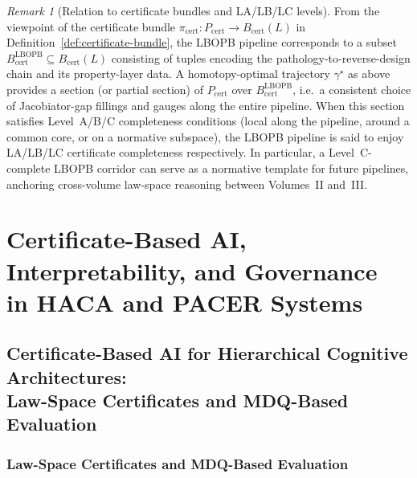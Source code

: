 \documentclass[11pt]{book}
\theoremstyle{plain}
\theoremstyle{definition}
\theoremstyle{remark}
\newtheorem{remark}[theorem]{Remark}
\begin{document}
\begin{remark}[Relation to certificate bundles and LA/LB/LC levels]
\label{rem:lbopb-cert-bundle-levels}
From the viewpoint of the certificate bundle
$\pi_{\mathrm{cert}}:P_{\mathrm{cert}}\to B_{\mathrm{cert}}(L)$ in
Definition~\ref{def:certificate-bundle}, the LBOPB pipeline corresponds
to a subset $B_{\mathrm{cert}}^{\mathrm{LBOPB}}\subseteq B_{\mathrm{cert}}(L)$
consisting of tuples encoding the pathology-to-reverse-design chain
and its property-layer data. A homotopy-optimal trajectory $\gamma^\star$
as above provides a section (or partial section) of $P_{\mathrm{cert}}$ over
$B_{\mathrm{cert}}^{\mathrm{LBOPB}}$, i.e.\ a consistent choice of
Jacobiator-gap fillings and gauges along the entire pipeline. When this
section satisfies Level~A/B/C completeness conditions (local along the
pipeline, around a common core, or on a normative subspace), the LBOPB
pipeline is said to enjoy LA/LB/LC certificate completeness respectively.
In particular, a Level~C-complete LBOPB corridor can serve as a normative
template for future pipelines, anchoring cross-volume law-space reasoning
between Volumes~II and~III.
\end{remark}





\part[Certificate-Based AI, Interpretability, and Governance]{Certificate-Based AI, Interpretability, and Governance\\
      in HACA and PACER Systems}

\chapter[Certificate-Based AI for Hierarchical Cognitive Architectures]{Certificate-Based AI for Hierarchical Cognitive Architectures:\\
         Law-Space Certificates and MDQ-Based Evaluation}


\section[Law-Space Certificates and MDQ-Based Evaluation]{Law-Space Certificates and MDQ-Based Evaluation}
\end{document}
